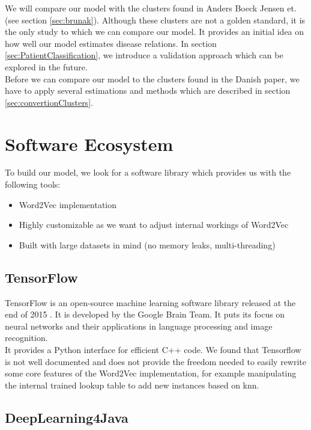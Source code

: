 We will compare our model with the clusters found in Anders Boeck Jensen et. \cite{Brunak:article} (see section \ref{sec:brunak}). Although these clusters are not a golden standard, it is the only study to which we can compare our model. It provides an initial idea on how well our model estimates disease relations. In section \ref{sec:PatientClassification}, we introduce a validation approach which can be explored in the future. \\
Before we can compare our model to the clusters found in the Danish paper, we have to apply several estimations and methods which are described in section \ref{sec:convertionClusters}.


\section{Software Ecosystem}

To build our model, we look for a software library which provides us with the following tools:

\begin{itemize}

\item Word2Vec implementation
\item Highly customizable as we want to adjust internal workings of Word2Vec
\item Built with large datasets in mind (no memory leaks, multi-threading)

\end{itemize}

\subsection{TensorFlow}

TensorFlow is an open-source machine learning software library released at the end of 2015 \cite{tensorflow:article}. It is developed by the Google Brain Team. It puts its focus on neural networks and their applications in language processing and image recognition. \\
It provides a Python interface for efficient C++ code. We found that Tensorflow is not well documented and does not provide the freedom needed to easily rewrite some core features of the Word2Vec implementation, for example manipulating the internal trained lookup table to add new instances based on knn.


\subsection{DeepLearning4Java}

